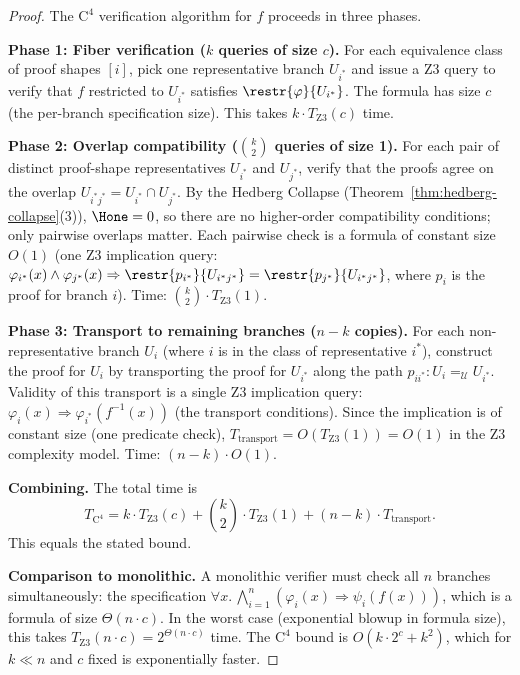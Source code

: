 \begin{proof}
The $\mathrm{C}^4$ verification algorithm for $f$ proceeds in three
phases.

\textbf{Phase 1: Fiber verification ($k$ queries of size $c$).}
For each equivalence class of proof shapes $[i]$, pick one representative
branch $U_{i^*}$ and issue a Z3 query to verify that $f$ restricted to
$U_{i^*}$ satisfies $\restr{\varphi}{U_{i^*}}$.  The formula has size
$c$ (the per-branch specification size).  This takes $k \cdot T_{\mathrm{Z3}}(c)$ time.

\textbf{Phase 2: Overlap compatibility ($\binom{k}{2}$ queries of size 1).}
For each pair of distinct proof-shape representatives $U_{i^*}$ and
$U_{j^*}$, verify that the proofs agree on the overlap
$U_{i^* j^*} = U_{i^*} \cap U_{j^*}$.  By the Hedberg Collapse
(Theorem~\ref{thm:hedberg-collapse}(3)), $\Hone = 0$, so there are
no higher-order compatibility conditions; only pairwise overlaps matter.
Each pairwise check is a formula of constant size $O(1)$ (one Z3 implication
query: $\varphi_{i^*}(x) \wedge \varphi_{j^*}(x) \Rightarrow
\restr{p_{i^*}}{U_{i^* j^*}} = \restr{p_{j^*}}{U_{i^* j^*}}$,
where $p_i$ is the proof for branch $i$).
Time: $\binom{k}{2} \cdot T_{\mathrm{Z3}}(1)$.

\textbf{Phase 3: Transport to remaining branches ($n - k$ copies).}
For each non-representative branch $U_i$ (where $i$ is in the class
of representative $i^*$), construct the proof for $U_i$ by transporting
the proof for $U_{i^*}$ along the path $p_{i i^*} : U_i =_\mathcal{U} U_{i^*}$.
Validity of this transport is a single Z3 implication query:
$\varphi_i(x) \Rightarrow \varphi_{i^*}(f^{-1}(x))$ (the transport
conditions).  Since the implication is of constant size (one predicate
check), $T_{\mathrm{transport}} = O(T_{\mathrm{Z3}}(1)) = O(1)$ in
the Z3 complexity model.
Time: $(n - k) \cdot O(1)$.

\textbf{Combining.}
The total time is
\[
  T_{\mathrm{C}^4}
  = k \cdot T_{\mathrm{Z3}}(c) + \binom{k}{2} \cdot T_{\mathrm{Z3}}(1)
  + (n-k) \cdot T_{\mathrm{transport}}.
\]
This equals the stated bound.

\textbf{Comparison to monolithic.}
A monolithic verifier must check all $n$ branches simultaneously:
the specification $\forall x.\, \bigwedge_{i=1}^n
(\varphi_i(x) \Rightarrow \psi_i(f(x)))$,
which is a formula of size $\Theta(n \cdot c)$.
In the worst case (exponential blowup in formula size), this takes
$T_{\mathrm{Z3}}(n \cdot c) = 2^{\Theta(n \cdot c)}$ time.
The $\mathrm{C}^4$ bound is $O(k \cdot 2^c + k^2)$,
which for $k \ll n$ and $c$ fixed is exponentially faster.
\end{proof}

